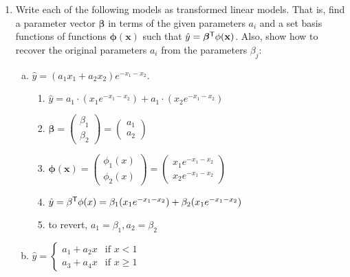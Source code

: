\documentclass[11pt]{article}
\newcommand{\xbf}{\mathbf{x}}
\def\betabf{{\boldsymbol \beta}}
\def\phibf{{\boldsymbol \phi}}
\newcommand{\tran}{^{\text{\sf T}}}
\begin{document}
\begin{enumerate}
\item Write each of the following models as transformed linear models.
That is, find a parameter vector $\betabf$ in terms of the given parameters $a_i$
and a set basis functions of functions $\phibf(\xbf)$ such that $\hat{y}=\betabf\tran\phi(\xbf)$.
Also, show how to recover the original parameters $a_i$ from the parameters $\beta_j$:
\begin{enumerate}[(a)]
\item $\hat{y} = (a_1x_1+a_2x_2)e^{-x_1-x_2}$.
\begin{enumerate}
    \item $\hat{y} = a_1\cdot(x_1e^{-x_1-x_2})+a_1\cdot(x_2e^{-x_1-x_2})$
    \item $\boldsymbol{\beta} = \begin{pmatrix} \beta_1 \\ \beta_2\end{pmatrix}=\begin{pmatrix} a_1 \\ a_2\end{pmatrix}$
    \item $\boldsymbol{\phi(x)} = \begin{pmatrix} \phi_1(x) \\ \phi_2(x)\end{pmatrix}=\begin{pmatrix}
        x_1e^{-x_1-x_2}  \\ x_2e^{-x_1-x_2}
    \end{pmatrix}$
    \item $\hat{y}=\beta\tran\phi(x)=\beta_1(x_1e^{-x_1-x_2})+\beta_2(x_1e^{-x_1-x_2})$
    \item to revert, $a_1=\beta_1,a_2=\beta_2$
\end{enumerate}
\item $\hat{y} = \begin{cases}
    a_1 + a_2x & \mbox{if } x < 1 \\
    a_3 + a_4x & \mbox{if } x \geq 1
    \end{cases}$
\end{enumerate}
\end{enumerate}
\end{document}
